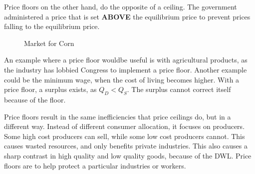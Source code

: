 Price floors on the other hand, do the opposite of a ceiling. The government administered a price that is set \textbf{ABOVE} the equilibrium price to prevent prices falling to the equilibrium price.

\begin{figure}[h!]
\begin{center}
\caption{Market for Corn}
\label{fig:corn}
\end{center}
\end{figure}

An example where a price floor wouldbe useful is with agricultural products, as the industry has lobbied Congress to implement a price floor. Another example could be the minimum wage, when the cost of living becomes higher. With a price floor, a surplus exists, as $Q_D < Q_S$. The surplus cannot correct itself because of the floor. 

Price floors result in the same inefficiencies that price ceilings do, but in a different way. Instead of different consumer allocation, it focuses on producers. Some high cost producers can sell, while some low cost producers cannot. This causes wasted resources, and only benefits private industries. This also causes a sharp contrast in high quality and low quality goods, because of the DWL. Price floors are to help protect a particular industries or workers.

